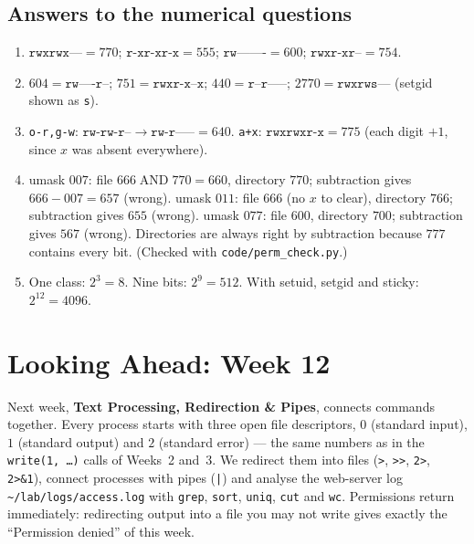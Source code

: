 \documentclass[11pt,a4paper]{article}
\newcommand{\cmd}[1]{\texttt{#1}}
\begin{document}
\subsection*{Answers to the numerical questions}
\begin{enumerate}[leftmargin=1.6em,start=9]
  \item $\texttt{rwxrwx---} = 770$; $\texttt{r-xr-xr-x} = 555$; $\texttt{rw-------} = 600$; $\texttt{rwxr-xr--} = 754$.
  \item $604 = \texttt{rw----r--}$; $751 = \texttt{rwxr-x--x}$; $440 = \texttt{r--r-----}$; $2770 = \texttt{rwxrws---}$ (setgid shown as \texttt{s}).
  \item \texttt{o-r,g-w}: $\texttt{rw-rw-r--} \to \texttt{rw-r-----} = 640$. \texttt{a+x}: $\texttt{rwxrwxr-x} = 775$ (each digit $+1$, since $x$ was absent everywhere).
  \item umask $007$: file $666 \mathbin{\text{AND}} 770 = 660$, directory $770$; subtraction gives $666-007 = 657$ (wrong). umask $011$: file $666$ (no $x$ to clear), directory $766$; subtraction gives $655$ (wrong). umask $077$: file $600$, directory $700$; subtraction gives $567$ (wrong). Directories are always right by subtraction because $777$ contains every bit. (Checked with \cmd{code/perm\_check.py}.)
  \item One class: $2^3 = 8$. Nine bits: $2^9 = 512$. With setuid, setgid and sticky: $2^{12} = 4096$.
\end{enumerate}

\section{Looking Ahead: Week 12}

Next week, \textbf{Text Processing, Redirection \& Pipes}, connects commands together. Every process starts with three open file descriptors, $0$ (standard input), $1$ (standard output) and $2$ (standard error) --- the same numbers as in the \cmd{write(1, \dots)} calls of Weeks~2 and~3. We redirect them into files (\texttt{>}, \texttt{>>}, \texttt{2>}, \texttt{2>\&1}), connect processes with pipes (\texttt{|}) and analyse the web-server log \texttt{\textasciitilde/lab/logs/access.log} with \cmd{grep}, \cmd{sort}, \cmd{uniq}, \cmd{cut} and \cmd{wc}. Permissions return immediately: redirecting output into a file you may not write gives exactly the ``Permission denied'' of this week.
\end{document}
